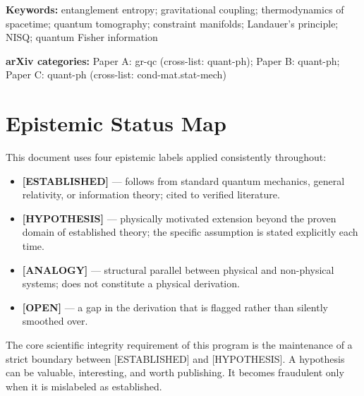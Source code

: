 \documentclass[12pt,letterpaper]{article}
\theoremstyle{plain}
\theoremstyle{definition}
\theoremstyle{remark}
\begin{document}
\begin{titlepage}
\vspace{0.8em}
\noindent\textbf{Keywords:} entanglement entropy; gravitational coupling;
thermodynamics of spacetime; quantum tomography; constraint manifolds;
Landauer's principle; NISQ; quantum Fisher information

\noindent\textbf{arXiv categories:} Paper A: gr-qc (cross-list: quant-ph);
Paper B: quant-ph; Paper C: quant-ph (cross-list: cond-mat.stat-mech)
\end{titlepage}

\tableofcontents
\newpage

\section*{Epistemic Status Map}

This document uses four epistemic labels applied consistently throughout:

\begin{itemize}
  \item \textcolor{blue!70!black}{\textbf{[ESTABLISHED]}} --- follows
    from standard quantum mechanics, general relativity, or information
    theory; cited to verified literature.
  \item \textcolor{orange!80!black}{\textbf{[HYPOTHESIS]}} --- physically
    motivated extension beyond the proven domain of established theory;
    the specific assumption is stated explicitly each time.
  \item \textbf{[ANALOGY]} --- structural parallel between physical and
    non-physical systems; does not constitute a physical derivation.
  \item \textcolor{red!70!black}{\textbf{[OPEN]}} --- a gap in the
    derivation that is flagged rather than silently smoothed over.
\end{itemize}

The core scientific integrity requirement of this program is the
maintenance of a strict boundary between [ESTABLISHED] and [HYPOTHESIS].
A hypothesis can be valuable, interesting, and worth publishing. It
becomes fraudulent only when it is mislabeled as established.

\newpage
\end{document}
